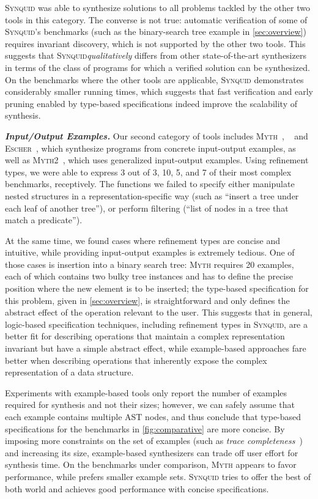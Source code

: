 \documentclass[10pt,preprint]{sigplanconf-pldi16}
\theoremstyle{definition}
\newcommand{\custompar}[1]{\parskip 0pt \textbf{\textit{#1}}}
\newcommand{\tool}{\textsc{Synquid}\xspace}
\begin{document}
\tool was able to synthesize solutions to all problems tackled by the other two tools in this category.
The converse is not true: automatic verification of some of \tool's benchmarks (such as the binary-search tree example in \autoref{sec:overview}) 
requires invariant discovery, which is not supported by the other two tools. 
This suggests that \tool \emph{qualitatively} differs from other state-of-the-art synthesizers in terms of the class of programs for which a verified solution can be synthesized.
On the benchmarks where the other tools are applicable, \tool demonstrates considerably smaller running times,
which suggests that fast verification and early pruning enabled by type-based specifications indeed improve the scalability of synthesis. 

\custompar{Input/Output Examples.}
Our second category of tools includes \textsc{Myth}~\cite{OseraZd15}, \textsc{}~\cite{FeserChDi15} and \textsc{Escher}~\cite{AlbarghouthiGuKi13},
which synthesize programs from concrete input-output examples,
as well as \textsc{Myth2}~\cite{FrankleOWZ16}, which uses generalized input-output examples.
Using refinement types, we were able to express 3 out of 3, 10, 5, and 7 of their most complex benchmarks, receptively.
The functions we failed to specify either manipulate nested structures in a representation-specific way (such as ``insert a tree under each leaf of another tree''),
or perform filtering (``list of nodes in a tree that match a predicate'').

At the same time, we found cases where refinement types are concise and intuitive, 
while providing input-output examples is extremely tedious.
One of those cases is insertion into a binary search tree:
\textsc{Myth} requires 20 examples,
each of which contains two bulky tree instances and has to define the precise position where the new element is to be inserted;
the type-based specification for this problem, given in \autoref{sec:overview}, 
is straightforward and only defines the abstract effect of the operation relevant to the user. 
This suggests that in general, logic-based specification techniques, including refinement types in \tool, 
are a better fit for describing operations that maintain a complex representation invariant but have a simple abstract effect,
while example-based approaches fare better when describing operations that inherently expose the complex representation of a data structure.

Experiments with example-based tools only report the number of examples required for synthesis and not their sizes;
however, we can safely assume that each example contains multiple AST nodes,
and thus conclude that type-based specifications for the benchmarks in \autoref{fig:comparative} are more concise.
By imposing more constraints on the set of examples (such as \emph{trace completeness}~\cite{OseraZd15}) and increasing its size,
example-based synthesizers can trade off user effort for synthesis time.
On the benchmarks under comparison, \textsc{Myth} appears to favor performance, while  prefers smaller example sets.
\tool tries to offer the best of both world and achieves good performance with concise specifications.
\end{document}
